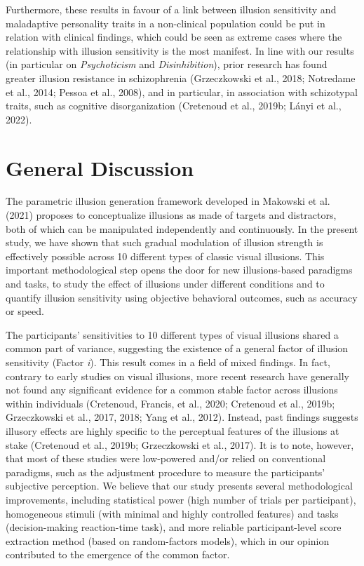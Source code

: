 \documentclass[
  man,floatsintext]{apa6}
\begin{document}
Furthermore, these results in favour of a link between illusion sensitivity and maladaptive personality traits in a non-clinical population could be put in relation with clinical findings, which could be seen as extreme cases where the relationship with illusion sensitivity is the most manifest. In line with our results (in particular on \emph{Psychoticism} and \emph{Disinhibition}), prior research has found greater illusion resistance in schizophrenia (Grzeczkowski et al., 2018; Notredame et al., 2014; Pessoa et al., 2008), and in particular, in association with schizotypal traits, such as cognitive disorganization (Cretenoud et al., 2019b; Lányi et al., 2022).

\hypertarget{general-discussion}{%
\section{General Discussion}\label{general-discussion}}

The parametric illusion generation framework developed in Makowski et al. (2021) proposes to conceptualize illusions as made of targets and distractors, both of which can be manipulated independently and continuously. In the present study, we have shown that such gradual modulation of illusion strength is effectively possible across 10 different types of classic visual illusions. This important methodological step opens the door for new illusions-based paradigms and tasks, to study the effect of illusions under different conditions and to quantify illusion sensitivity using objective behavioral outcomes, such as accuracy or speed.

The participants' sensitivities to 10 different types of visual illusions shared a common part of variance, suggesting the existence of a general factor of illusion sensitivity (Factor \emph{i}). This result comes in a field of mixed findings. In fact, contrary to early studies on visual illusions, more recent research have generally not found any significant evidence for a common stable factor across illusions within individuals (Cretenoud, Francis, et al., 2020; Cretenoud et al., 2019b; Grzeczkowski et al., 2017, 2018; Yang et al., 2012). Instead, past findings suggests illusory effects are highly specific to the perceptual features of the illusions at stake (Cretenoud et al., 2019b; Grzeczkowski et al., 2017). It is to note, however, that most of these studies were low-powered and/or relied on conventional paradigms, such as the adjustment procedure to measure the participants' subjective perception. We believe that our study presents several methodological improvements, including statistical power (high number of trials per participant), homogeneous stimuli (with minimal and highly controlled features) and tasks (decision-making reaction-time task), and more reliable participant-level score extraction method (based on random-factors models), which in our opinion contributed to the emergence of the common factor.
\end{document}

